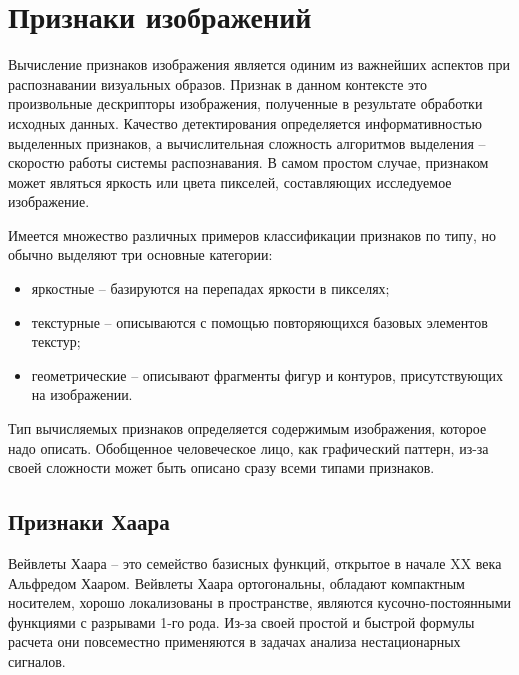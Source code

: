 \documentclass[a4paper, 12pt]{article}		%
\begin{document}

\tableofcontents





\newpage
\section{Признаки изображений}

Вычисление признаков изображения является одиним из важнейших аспектов при распознавании визуальных образов. Признак в данном контексте это произвольные дескрипторы изображения, полученные в результате обработки исходных данных. Качество детектирования определяется информативностью выделенных признаков, а вычислительная сложность алгоритмов выделения -- скоростю работы системы распознавания. В самом простом случае, признаком может являться яркость или цвета пикселей, составляющих исследуемое изображение.

Имеется множество различных примеров классификации признаков по типу, но обычно выделяют три основные категории:
\begin{itemize}
\item яркостные -- базируются на перепадах яркости в пикселях;
\item текстурные -- описываются с помощью повторяющихся базовых элементов текстур;
\item геометрические -- описывают фрагменты фигур и контуров, присутствующих на изображении.
\end{itemize}

Тип вычисляемых признаков определяется содержимым изображения, которое надо описать. Обобщенное человеческое лицо, как графический паттерн, из-за своей сложности может быть описано сразу всеми типами признаков. 

\subsection{Признаки Хаара}

Вейвлеты Хаара -- это семейство базисных функций, открытое в начале XX века Альфредом Хааром. Вейвлеты Хаара ортогональны, обладают компактным носителем, хорошо локализованы в пространстве, являются кусочно-постоянными функциями с разрывами 1-го рода. Из-за своей простой и быстрой формулы расчета они повсеместно применяются в задачах анализа нестационарных сигналов.
\end{document}
